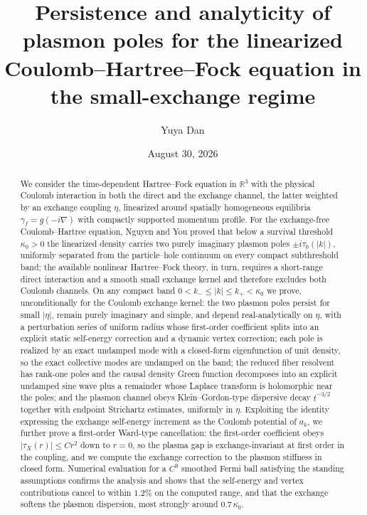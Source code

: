 \documentclass[11pt,a4paper]{amsart}
\title[Plasmon poles for the linearized Coulomb--Hartree--Fock equation]{Persistence and analyticity of plasmon poles for the linearized Coulomb--Hartree--Fock equation in the small-exchange regime}
\author{Yuya Dan}
\date{August 30, 2026}
\theoremstyle{definition}
\theoremstyle{remark}
\newcommand{\R}{\mathbb{R}}
\begin{document}
\begin{abstract}
We consider the time-dependent Hartree--Fock equation in $\R^3$ with the physical Coulomb interaction in both the direct and the exchange channel, the latter weighted by an exchange coupling $\eta$, linearized around spatially homogeneous equilibria $\gamma_f=g(-i\nabla)$ with compactly supported momentum profile. For the exchange-free Coulomb--Hartree equation, Nguyen and You proved that below a survival threshold $\kappa_0>0$ the linearized density carries two purely imaginary plasmon poles $\pm i\tau_0(|k|)$, uniformly separated from the particle--hole continuum on every compact subthreshold band; the available nonlinear Hartree--Fock theory, in turn, requires a short-range direct interaction and a smooth small exchange kernel and therefore excludes both Coulomb channels. On any compact band $0<k_-\le|k|\le k_+<\kappa_0$ we prove, unconditionally for the Coulomb exchange kernel: the two plasmon poles persist for small $|\eta|$, remain purely imaginary and simple, and depend real-analytically on $\eta$, with a perturbation series of uniform radius whose first-order coefficient splits into an explicit static self-energy correction and a dynamic vertex correction; each pole is realized by an exact undamped mode with a closed-form eigenfunction of unit density, so the exact collective modes are undamped on the band; the reduced fiber resolvent has rank-one poles and the causal density Green function decomposes into an explicit undamped sine wave plus a remainder whose Laplace transform is holomorphic near the poles; and the plasmon channel obeys Klein--Gordon-type dispersive decay $t^{-3/2}$ together with endpoint Strichartz estimates, uniformly in $\eta$. Exploiting the identity expressing the exchange self-energy increment as the Coulomb potential of $a_k$, we further prove a first-order Ward-type cancellation: the first-order coefficient obeys $|\tau_X(r)|\le Cr^2$ down to $r=0$, so the plasma gap is exchange-invariant at first order in the coupling, and we compute the exchange correction to the plasmon stiffness in closed form. Numerical evaluation for a $C^9$ smoothed Fermi ball satisfying the standing assumptions confirms the analysis and shows that the self-energy and vertex contributions cancel to within $1.2\%$ on the computed range, and that the exchange softens the plasmon dispersion, most strongly around $0.7\,\kappa_0$.
\end{abstract}

\maketitle
\end{document}
